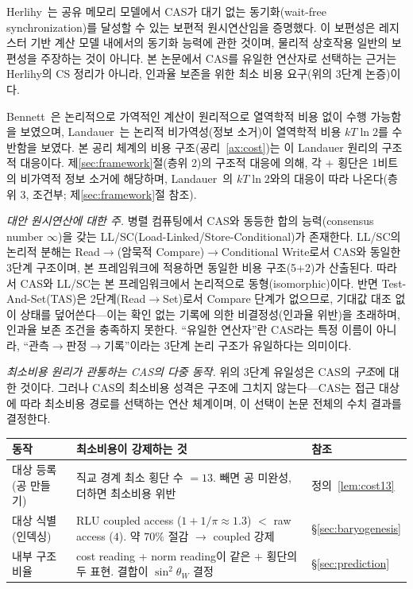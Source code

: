 \documentclass[entropy,article,submit,pdftex,oneauthor]{Definitions/mdpi}
\begin{document}
Herlihy~\cite{herlihy1991}는 공유 메모리 모델에서 CAS가 대기 없는 동기화(wait-free synchronization)를 달성할 수 있는 보편적 원시연산임을 증명했다. 이 보편성은 레지스터 기반 계산 모델 내에서의 동기화 능력에 관한 것이며, 물리적 상호작용 일반의 보편성을 주장하는 것이 아니다. 본 논문에서 CAS를 유일한 연산자로 선택하는 근거는 Herlihy의 CS 정리가 아니라, 인과율 보존을 위한 최소 비용 요구(위의 3단계 논증)이다.

Bennett~\cite{bennett1973}은 논리적으로 가역적인 계산이 원리적으로 열역학적 비용 없이 수행 가능함을 보였으며, Landauer~\cite{landauer1961}는 논리적 비가역성(정보 소거)이 열역학적 비용 $kT\ln 2$를 수반함을 보였다. 본 공리 체계의 비용 구조(공리~\ref{ax:cost})는 이 Landauer 원리의 구조적 대응이다. 제\ref{sec:framework}절(층위 2)의 구조적 대응에 의해, 각 $+$ 횡단은 1비트의 비가역적 정보 소거에 해당하며, Landauer~\cite{landauer1961}의 $kT\ln 2$와의 대응이 따라 나온다(층위 3, 조건부; 제\ref{sec:framework}절 참조).

\emph{대안 원시연산에 대한 주.} 병렬 컴퓨팅에서 CAS와 동등한 합의 능력(consensus number $\infty$)을 갖는 LL/SC(Load-Linked/Store-Conditional)가 존재한다. LL/SC의 논리적 분해는 Read$\to$(암묵적 Compare)$\to$Conditional Write로서 CAS와 동일한 3단계 구조이며, 본 프레임워크에 적용하면 동일한 비용 구조(5+2)가 산출된다. 따라서 CAS와 LL/SC는 본 프레임워크에서 논리적으로 동형(isomorphic)이다. 반면 Test-And-Set(TAS)은 2단계(Read$\to$Set)로서 Compare 단계가 없으므로, 기대값 대조 없이 상태를 덮어쓴다---이는 확인 없는 기록에 의한 비결정성(인과율 위반)을 초래하며, 인과율 보존 조건을 충족하지 못한다. ``유일한 연산자''란 CAS라는 특정 이름이 아니라, ``관측$\to$판정$\to$기록''이라는 3단계 논리 구조가 유일하다는 의미이다.

\emph{최소비용 원리가 관통하는 CAS의 다중 동작.} 위의 3단계 유일성은 CAS의 \emph{구조}에 대한 것이다. 그러나 CAS의 최소비용 성격은 구조에 그치지 않는다---CAS는 접근 대상에 따라 최소비용 경로를 선택하는 연산 체계이며, 이 선택이 논문 전체의 수치 결과를 결정한다.

\begin{center}
\small
\begin{tabular}{p{2.8cm}p{4.5cm}l}
\toprule
\textbf{동작} & \textbf{최소비용이 강제하는 것} & \textbf{참조} \\
\midrule
대상 등록 (공 만들기) & 직교 경계 최소 횡단 수 $= 13$. 빼면 공 미완성, 더하면 최소비용 위반 & 정의~\ref{lem:cost13} \\
대상 식별 (인덱싱) & RLU coupled access ($1{+}1/\pi \approx 1.3$) $<$ raw access ($4$). 약 $70\%$ 절감 $\to$ coupled 강제 & §\ref{sec:baryogenesis} \\
내부 구조 비율 & cost reading + norm reading이 같은 $+$ 횡단의 두 표현. 결합이 $\sin^2\theta_W$ 결정 & §\ref{sec:prediction} \\
\bottomrule
\end{tabular}
\end{center}
\end{document}
